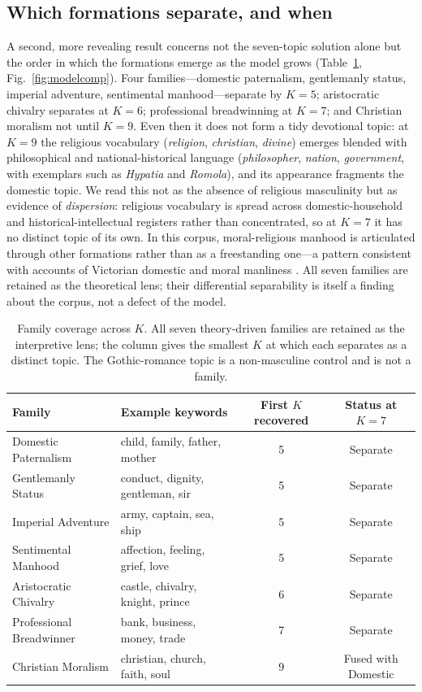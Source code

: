 \documentclass[11pt]{article}
\begin{document}
\subsection{Which formations separate, and when}
A second, more revealing result concerns not the seven-topic solution alone but
the order in which the formations emerge as the model grows
(Table~\ref{tab:coverage}, Fig.~\ref{fig:modelcomp}). Four families---domestic paternalism, gentlemanly
status, imperial adventure, sentimental manhood---separate by $K=5$; aristocratic
chivalry separates at $K=6$; professional breadwinning at $K=7$; and Christian
moralism not until $K=9$. Even then it does not form a tidy devotional topic: at
$K=9$ the religious vocabulary (\emph{religion}, \emph{christian}, \emph{divine})
emerges blended with philosophical and national-historical language
(\emph{philosopher}, \emph{nation}, \emph{government}, with exemplars such as
\emph{Hypatia} and \emph{Romola}), and its appearance fragments the domestic
topic. We read this not as the absence of religious masculinity but as evidence
of \emph{dispersion}: religious vocabulary is spread across domestic-household
and historical-intellectual registers rather than concentrated, so at $K=7$ it
has no distinct topic of its own. In this corpus, moral-religious manhood is
articulated through other formations rather than as a freestanding one---a
pattern consistent with accounts of Victorian domestic and moral manliness
\citep{tosh1999mans,sussman1995victorian}. All seven families are retained as the
theoretical lens; their differential separability is itself a finding about the
corpus, not a defect of the model.

\begin{table}[htbp]
\centering
\caption{Family coverage across $K$. All seven theory-driven families are
retained as the interpretive lens; the column gives the smallest $K$ at which
each separates as a distinct topic. The Gothic-romance topic is a non-masculine
control and is not a family.}
\label{tab:coverage}
\small
\begin{tabular}{l l c c}
\toprule
Family & Example keywords & First $K$ recovered & Status at $K=7$ \\
\midrule
Domestic Paternalism     & child, family, father, mother    & 5 & Separate \\
Gentlemanly Status       & conduct, dignity, gentleman, sir & 5 & Separate \\
Imperial Adventure       & army, captain, sea, ship         & 5 & Separate \\
Sentimental Manhood      & affection, feeling, grief, love  & 5 & Separate \\
Aristocratic Chivalry    & castle, chivalry, knight, prince & 6 & Separate \\
Professional Breadwinner & bank, business, money, trade     & 7 & Separate \\
Christian Moralism       & christian, church, faith, soul   & 9 & Fused with Domestic \\
\bottomrule
\end{tabular}
\end{table}
\end{document}

